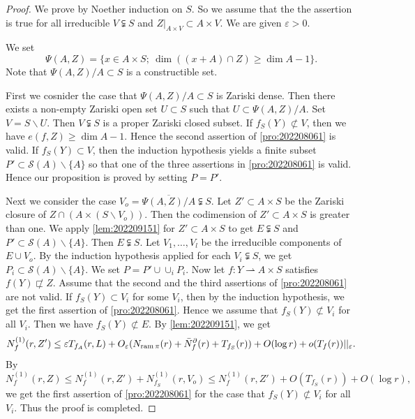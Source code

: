 \documentclass[11pt,english]{smfart}
\theoremstyle{plain}
\theoremstyle{definition}
\theoremstyle{remark}
\numberwithin{equation}{section}
\theoremstyle{plain}
\newcommand{\da}{\rightharpoonup}
\newcommand{\pN}[1]{\bar{N}_{#1}^{\partial}}
\newcommand{\ram}{{\rm ram}\,}
\begin{document}
	\begin{proof}
		We prove by Noether induction on $S$.
		So we assume that the the assertion is true for all irreducible $V\subsetneqq S$ and $Z|_{A\times V}\subset A\times V$.
		We are given $\varepsilon>0$.
		
		We set 
		$$
		\Psi(A,Z)=\{ x\in A\times S;\ \dim ((x+A)\cap Z)\geq \dim A-1\}.
		$$
		Note that $\Psi(A,Z)/A\subset S$ is a constructible set.
		
		First we cosnider the case that $\Psi(A,Z)/A\subset S$ is Zariski dense.
		Then there exists a non-empty Zariski open set $U\subset S$ such that $U\subset \Psi(A,Z)/A$.
		Set $V=S\backslash U$.
		Then $V\subsetneqq S$ is a proper Zariski closed subset.
		If $f_S(Y)\not\subset V$, then we have $e(f,Z)\geq \dim A-1$.
		Hence the second assertion of  \cref{pro:202208061} is valid.
		If $f_S(Y)\subset V$, then the induction hypothesis yields a finite subset $P'\subset \mathcal{S}(A)\backslash\{A\}$ so that one of the three assertions in \cref{pro:202208061} is valid.
		Hence our proposition is proved by setting $P=P'$.
		
		
		Next we consider the case $V_o=\overline{\Psi(A,Z)/A}\subsetneqq S$.
		Let $Z'\subset A\times S$ be the Zariski closure of $Z\cap (A\times (S\backslash V_o))$.
		Then the codimension of $Z'\subset A\times S$ is greater than one.
		We apply \cref{lem:202209151} for $Z'\subset A\times S$ to get $E\subsetneqq S$ and $P'\subset \mathcal{S}(A)\backslash \{A\}$.
		Then $E\subsetneqq S$.
		Let $V_1,\ldots,V_l$ be the irreducible components of $E\cup V_o$.
		By the induction hypothesis applied for each $V_i\subsetneqq S$, we get $P_i\subset \mathcal{S}(A)\backslash\{ A\}$.
		We set $P=P'\cup \cup_iP_i$.
		Now let $f:Y\da A\times S$ satisfies $f(Y)\not\sqsubset Z$.
		Assume that the second and the third assertions of  \cref{pro:202208061} are not valid.
		If $f_S(Y)\subset V_i$ for some $V_i$, then by the induction hypothesis, we get the first assertion of \cref{pro:202208061}.
		Hence we assume that $ f_S(Y)\not\subset V_i$ for all $V_i$.
		Then we have $f_S(Y)\not\subset E$.
		By \cref{lem:202209151}, we get
		$$
		N^{(1)}_{f}(r,Z')\leq \varepsilon T_{f_A}(r,L)+O_{\varepsilon}(N_{\ram\pi}(r)+\pN{f}(r)
		+T_{f_S}(r))+O(\log r)+o(T_f(r))||_{\varepsilon}.
		$$	
		By 
		$$N^{(1)}_f(r,Z)\leq N^{(1)}_{f}(r,Z')+N^{(1)}_{f_S}(r,V_o)\leq N^{(1)}_{f}(r,Z')+O(T_{f_S}(r))+O(\log r),$$
		we get the first assertion of \cref{pro:202208061} for the case that $ f_S(Y)\not\subset V_i$ for all $V_i$.
		Thus the proof is completed.
	\end{proof}
	
\end{document}
